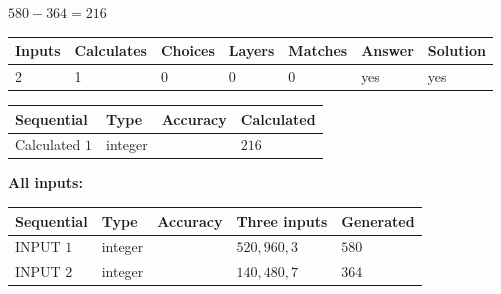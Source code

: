 \documentclass{ctexart}
\begin{document}
 

 
 
 
\noindent{}
 
 

$ %
580 -  %
364=   %
216$
 
 
\noindent{}
 
 

 
   
   
   
   
\noindent\begin{tabular}{|l|l|l|l|l|l|l|}
 \hline
Inputs & Calculates & Choices & Layers & Matches & Answer & Solution \\ \hline
 2  & 
 1  & 
 0
  & 
 0  & 
 0  & 
  yes & 
  yes 
  \\ \hline
 \end{tabular}
   
   
   
   
\noindent{}
   
   
  
  
\noindent\begin{tabular}{|l|l|l|l|}
\hline
 Sequential & Type & Accuracy & Calculated \\ 
\hline
 
 
  Calculated $  1 $ & integer &  & 
  $ 216 $ 
 \\  \hline  
 \end{tabular}
   
   
   
   
\noindent\vspace{0.1in}\hspace{-0.08in} {\textbf{\Large{All inputs: }}}
   
   
  
  
\noindent\begin{tabular}{|l|l|l|l|l|}
\hline
 Sequential & Type & Accuracy & Three inputs & Generated \\ 
\hline
 
 
  INPUT $  1 $ & integer &  & $
 520
 , 
 960
 , 
 3
 $ & $ 580 $ 
 \\  \hline  
 
 
  INPUT $  2 $ & integer &  & $
 140
 , 
 480
 , 
 7
 $ & $ 364 $ 
 \\  \hline  
 \end{tabular}
   
\end{document}
